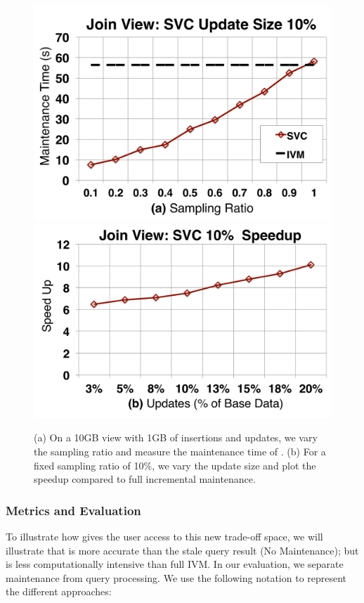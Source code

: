 \begin{figure}[t]\vspace{-2.5em}
\centering
\includegraphics[scale=0.14]{exp/msj_1.pdf}
\includegraphics[scale=0.14]{exp/msj_2.pdf}\vspace{-1em}
 \caption{(a) On a 10GB view with 1GB of insertions and updates, we vary the sampling ratio and measure the maintenance time of \svc. (b) For a fixed sampling ratio of 10\%, we vary the update size and plot the speedup compared to full incremental maintenance. \vspace{-.5em}\label{exp-1-samplesize}}
\end{figure}

\subsubsection{Metrics and Evaluation}
To illustrate how \svc gives the user access to this new trade-off space, we will illustrate that \svc is more accurate than the stale query result (No Maintenance); but is less computationally intensive than full IVM. 
In our evaluation, we separate maintenance from query processing.
We use the following notation to represent the different approaches:

